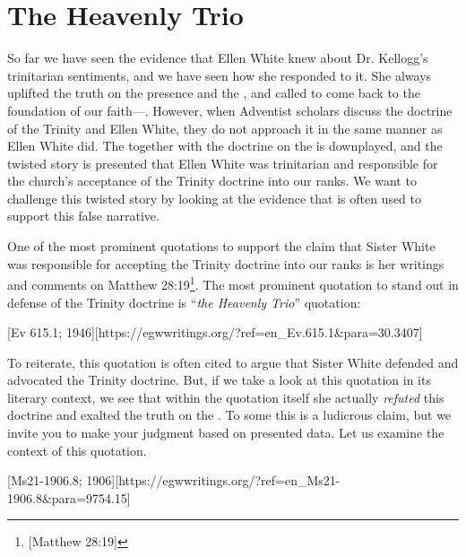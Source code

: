 \chapter{The Heavenly Trio}

So far we have seen the evidence that Ellen White knew about Dr. Kellogg's trinitarian sentiments, and we have seen how she responded to it. She always uplifted the truth on the presence and the , and called to come back to the foundation of our faith—. However, when Adventist scholars discuss the doctrine of the Trinity and Ellen White, they do not approach it in the same manner as Ellen White did. The  together with the doctrine on the  is downplayed, and the twisted story is presented that Ellen White was trinitarian and responsible for the church's acceptance of the Trinity doctrine into our ranks. We want to challenge this twisted story by looking at the evidence that is often used to support this false narrative.

One of the most prominent quotations to support the claim that Sister White was responsible for accepting the Trinity doctrine into our ranks is her writings and comments on Matthew 28:19\footnote{[Matthew 28:19]}. The most prominent quotation to stand out in defense of the Trinity doctrine is “\textit{the Heavenly Trio}” quotation:

[Ev 615.1; 1946][https://egwwritings.org/?ref=en\_Ev.615.1&para=30.3407]

To reiterate, this quotation is often cited to argue that Sister White defended and advocated the Trinity doctrine. But, if we take a look at this quotation in its literary context, we see that within the quotation itself she actually \textit{refuted} this doctrine and exalted the truth on the . To some this is a ludicrous claim, but we invite you to make your judgment based on presented data. Let us examine the context of this quotation.

[Ms21-1906.8; 1906][https://egwwritings.org/?ref=en\_Ms21-1906.8&para=9754.15]

